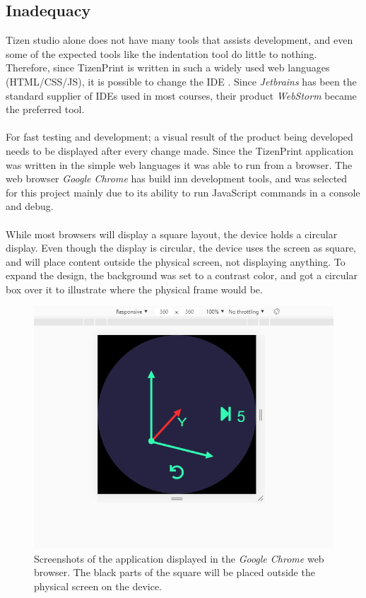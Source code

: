 \documentclass[a4paper, 12pt]{article}
\newcommand{\mysubsection}[1]{\subsection*{#1} \addcontentsline{toc}{subsection}{#1}}
\begin{document}
    \mysubsection{Inadequacy}
    Tizen studio alone does not have many tools that assists development, and even some of the expected tools like the
    indentation tool do little to nothing.
    Therefore, since TizenPrint is written in such a widely used web languages (HTML/CSS/JS), it is possible to change
    the IDE .
    Since \textit{Jetbrains} has been the standard supplier of IDEs used in most courses, their product \textit{WebStorm} became the
    preferred tool.
    \\\\
    For fast testing and development;
    a visual result of the product being developed needs to be displayed after every change made.
    Since the TizenPrint application was written in the simple web languages it was able to run from a browser.
    The web browser \textit{Google Chrome} has build inn development tools, and was selected for this project mainly due to its
    ability to run JavaScript commands in a console and debug.
    \\\\
    While most browsers will display a square layout, the device holds a circular display.
    Even though the display is circular, the device uses the screen as square, and will place content outside the physical screen,
    not displaying anything.
    To expand the design, the background was set to a contrast color, and got a circular box over it to illustrate where
    the physical frame would be.

    \begin{figure}[h!]
        \centering
        \includegraphics[scale=0.5]{figures/application-xyz-image.png}
        \caption{Screenshots of the application displayed in the \textit{Google Chrome} web browser.
        The black parts of the square will be placed outside the physical screen on the device.}
    \end{figure}
\end{document}
